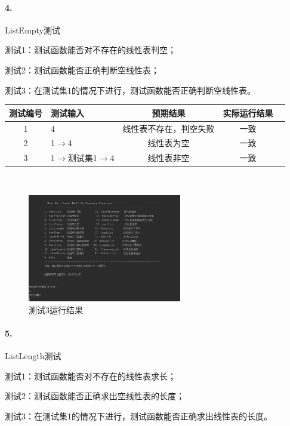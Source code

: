 \documentclass[supercite]{Experimental_Report}
\theoremstyle{definition}
\begin{document}
\paragraph{ 4.}ListEmpty测试

测试1：测试函数能否对不存在的线性表判空；

测试2：测试函数能否正确判断空线性表；

测试3：在测试集1的情况下进行，测试函数能否正确判断空线性表。

\vspace{0.5em}

\begin{tabular}{|c|l|c|c|c|}
	\hline
	测试编号 & 测试输入 & 预期结果 & 实际运行结果 \\
	\hline
	1 & 4 & 线性表不存在，判空失败 & 一致 \\
	\hline
	2 & 1$\rightarrow$4 & 线性表为空 & 一致 \\
	\hline
	3 & 1$\rightarrow$测试集1$\rightarrow$4 & 线性表非空 & 一致 \\
	\hline
\end{tabular}

~\

 \begin{figure}[H]
 	\centering
 	\includegraphics[width=0.6\textwidth]{images/线性表测试4.png}
 	\caption{测试3运行结果}
 	\label{txlab}
 \end{figure}


\paragraph{ 5.}ListLength测试


测试1：测试函数能否对不存在的线性表求长；

测试2：测试函数能否正确求出空线性表的长度；

测试3：在测试集1的情况下进行，测试函数能否正确求出线性表的长度。

\vspace{0.5em}
\end{document}
